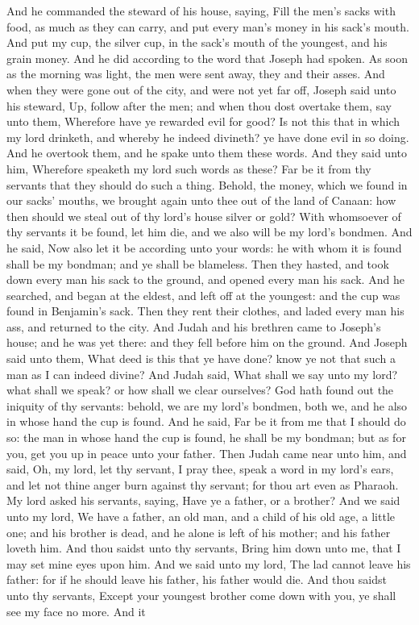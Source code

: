And he commanded the steward of his house, saying, Fill the men’s sacks with food, as much as they can carry, and put every man’s money in his sack’s mouth. And put my cup, the silver cup, in the sack’s mouth of the youngest, and his grain money. And he did according to the word that Joseph had spoken. As soon as the morning was light, the men were sent away, they and their asses. And when they were gone out of the city, and were not yet far off, Joseph said unto his steward, Up, follow after the men; and when thou dost overtake them, say unto them, Wherefore have ye rewarded evil for good? Is not this that in which my lord drinketh, and whereby he indeed divineth? ye have done evil in so doing. And he overtook them, and he spake unto them these words. And they said unto him, Wherefore speaketh my lord such words as these? Far be it from thy servants that they should do such a thing. Behold, the money, which we found in our sacks’ mouths, we brought again unto thee out of the land of Canaan: how then should we steal out of thy lord’s house silver or gold? With whomsoever of thy servants it be found, let him die, and we also will be my lord’s bondmen. And he said, Now also let it be according unto your words: he with whom it is found shall be my bondman; and ye shall be blameless. Then they hasted, and took down every man his sack to the ground, and opened every man his sack. And he searched, and began at the eldest, and left off at the youngest: and the cup was found in Benjamin’s sack. Then they rent their clothes, and laded every man his ass, and returned to the city.  And Judah and his brethren came to Joseph’s house; and he was yet there: and they fell before him on the ground. And Joseph said unto them, What deed is this that ye have done? know ye not that such a man as I can indeed divine? And Judah said, What shall we say unto my lord? what shall we speak? or how shall we clear ourselves? God hath found out the iniquity of thy servants: behold, we are my lord’s bondmen, both we, and he also in whose hand the cup is found. And he said, Far be it from me that I should do so: the man in whose hand the cup is found, he shall be my bondman; but as for you, get you up in peace unto your father.  Then Judah came near unto him, and said, Oh, my lord, let thy servant, I pray thee, speak a word in my lord’s ears, and let not thine anger burn against thy servant; for thou art even as Pharaoh. My lord asked his servants, saying, Have ye a father, or a brother? And we said unto my lord, We have a father, an old man, and a child of his old age, a little one; and his brother is dead, and he alone is left of his mother; and his father loveth him. And thou saidst unto thy servants, Bring him down unto me, that I may set mine eyes upon him. And we said unto my lord, The lad cannot leave his father: for if he should leave his father, his father would die. And thou saidst unto thy servants, Except your youngest brother come down with you, ye shall see my face no more. And it 